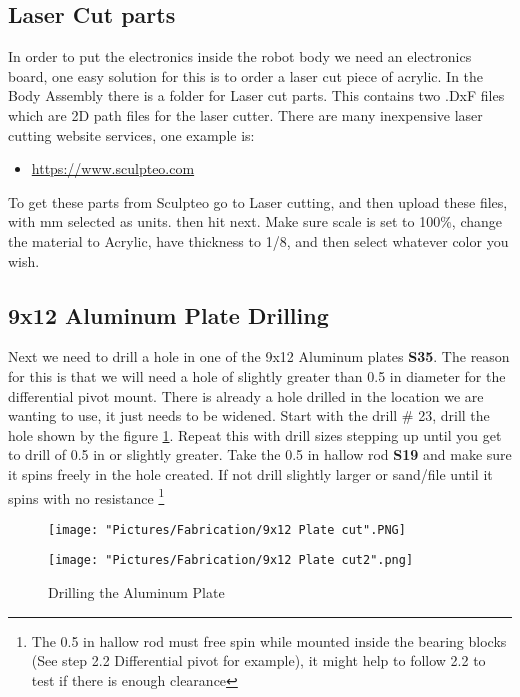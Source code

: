 \documentclass[12pt]{article}
\begin{document}
\subsection{Laser Cut parts}

In order to put the electronics inside the robot body we need an electronics board, one easy solution for this is to order a laser cut piece of acrylic. In the Body Assembly there is a folder for Laser cut parts. This contains two .DxF files which are 2D path files for the laser cutter. There are many inexpensive laser cutting website services, one example is:

\begin{itemize}
	\item \href{https://www.sculpteo.com}{https://www.sculpteo.com}
\end{itemize}

To get these parts from Sculpteo go to Laser cutting, and then upload these files, with mm selected as units. then hit next. Make sure scale is set to 100\%, change the material to Acrylic, have thickness to 1/8, and then select whatever color you wish. 


\subsection{9x12 Aluminum Plate Drilling}
Next we need to drill a hole in one of the 9x12 Aluminum plates \textbf{S35}. The reason for this is that we will need a hole of slightly greater than 0.5 in diameter for the differential pivot mount. There is already a hole drilled in the location we are wanting to use, it just needs to be widened. Start with the drill \# 23, drill the hole shown by the figure \ref{Drilling the Al plate}. Repeat this with drill sizes stepping up until you get to drill of 0.5 in or slightly greater. Take the 0.5 in hallow rod \textbf{S19} and make sure it spins freely in the hole created. If not drill slightly larger or sand/file until it spins with no resistance \footnote{The 0.5 in hallow rod must free spin while mounted inside the bearing blocks (See step 2.2 Differential pivot for example), it might help to follow 2.2 to test if there is enough clearance} 

\begin{figure}[H]
  \centering
  \begin{minipage}[b]{0.45\textwidth}
    \texttt{[image: "Pictures/Fabrication/9x12 Plate cut".PNG]}
  \end{minipage}
  \hfill
  \begin{minipage}[b]{0.45\textwidth}
    \texttt{[image: "Pictures/Fabrication/9x12 Plate cut2".png]}
  \end{minipage}
  \caption{Drilling the Aluminum Plate}
  \label{Drilling the Al plate}
\end{figure}
\end{document}
